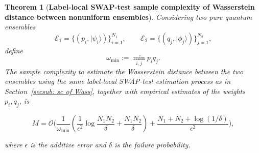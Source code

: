 \documentclass[aps,prx,reprint,superscriptaddress,amsmath,amssymb,longbibliography,floatfix]{revtex4-2}
\providecommand{\ket}[1]{|#1 \rangle}
\newcommand{\scE}{\mathcal{E}}
\newcommand{\scO}{\mathcal{O}}
\theoremstyle{plain}
\newtheorem{theorem}{Theorem}[section]
\theoremstyle{definition}
\theoremstyle{remark}
\begin{document}
\begin{theorem}[\textbf{Label-local SWAP-test sample complexity of Wasserstein distance between nonuniform ensembles}]
    \label{thm: nonuniform wasserstein swap}
    Considering two pure quantum ensembles
    \[
        \scE_1=\{(p_i,\ket{\psi_i})\}_{i=1}^{N_1},
        \qquad
        \scE_2=\{(q_j,\ket{\phi_j})\}_{j=1}^{N_2},
    \]
    define
    \[
        \omega_{\min}:=\min_{i,j}p_iq_j .
    \]
    The sample complexity to estimate the Wasserstein distance between the two ensembles using the same label-local SWAP-test estimation process as in Section~\ref{secsub: sc of Wass}, together with empirical estimates of the weights \(p_i,q_j\), is
    \begin{widetext}
\begin{equation}
        M
        =
        \scO\Bigg(
            \frac{1}{\omega_{\min}}
            \left(
                \frac{1}{\epsilon^2}\log\frac{N_1N_2}{\delta}
                +
                \frac{N_1N_2}{\delta}
            \right)
            +
            \frac{N_1+N_2+\log(1/\delta)}{\epsilon^2}
        \Bigg),
        \label{eq: nonuniform wasserstein local bound}
    \end{equation}
\end{widetext}
    where \(\epsilon\) is the additive error and \(\delta\) is the failure probability.
\end{theorem}
\end{document}
